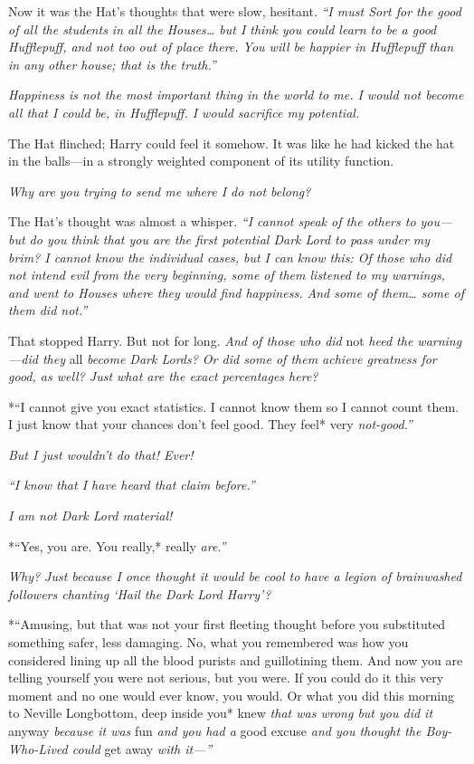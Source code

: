 Now it was the Hat's thoughts that were slow, hesitant. \emph{``I must
Sort for the good of all the students in all the Houses\ldots{} but I
think you could learn to be a good Hufflepuff, and not too out of place
there. You will be happier in Hufflepuff than in any other house; that
is the truth.''}

\emph{Happiness is not the most important thing in the world to me. I
would not become all that I could be, in Hufflepuff. I would sacrifice
my potential.}

The Hat flinched; Harry could feel it somehow. It was like he had kicked
the hat in the balls---in a strongly weighted component of its utility
function.

\emph{Why are you trying to send me where I do not belong?}

The Hat's thought was almost a whisper. \emph{``I cannot speak of the
others to you---but do you think that you are the first potential Dark
Lord to pass under my brim? I cannot know the individual cases, but I
can know this: Of those who did not intend evil from the very beginning,
some of them listened to my warnings, and went to Houses where they
would find happiness. And some of them\ldots{} some of them did not.''}

That stopped Harry. But not for long. \emph{And of those who did} not
\emph{heed the warning---did they} all \emph{become Dark Lords? Or did
some of them achieve greatness for good, as well? Just what are the
exact percentages here?}

*``I cannot give you exact statistics. I cannot know them so I cannot
count them. I just know that your chances don't feel good. They feel*
very \emph{not-good.''}

\emph{But I just wouldn't do that! Ever!}

\emph{``I know that I have heard that claim before.''}

\emph{I am not Dark Lord material!}

*``Yes, you are. You really,* really \emph{are.''}

\emph{Why? Just because I once thought it would be cool to have a legion
of brainwashed followers chanting `Hail the Dark Lord Harry'?}

*``Amusing, but that was not your first fleeting thought before you
substituted something safer, less damaging. No, what you remembered was
how you considered lining up all the blood purists and guillotining
them. And now you are telling yourself you were not serious, but you
were. If you could do it this very moment and no one would ever know,
you would. Or what you did this morning to Neville Longbottom, deep
inside you* knew \emph{that was wrong but you did it} anyway
\emph{because it was} fun \emph{and you had a} good excuse \emph{and you
thought the Boy-Who-Lived could} get away \emph{with it---''}

